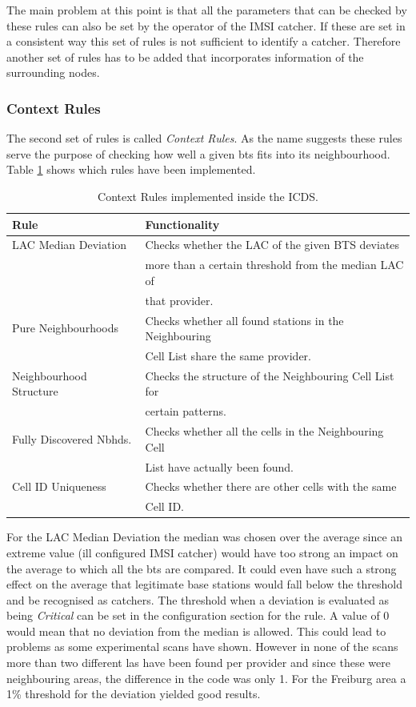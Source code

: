The main problem at this point is that all the parameters that can be checked by these rules can also be set by the operator of the IMSI catcher.
If these are set in a consistent way this set of rules is not sufficient to identify a catcher.
Therefore another set of rules has to be added that incorporates information of the surrounding nodes.

\subsubsection{Context Rules}
The second set of rules is called \emph{Context Rules}.
As the name suggests these rules serve the purpose of checking how well a given \gls{bts} fits into its neighbourhood.
Table \ref{tab:context_rules} shows which rules have been implemented.
\begin{table}
\centering
\begin{tabular}{ll}
\toprule
Rule					&Functionality\\
\midrule
LAC Median Deviation	&Checks whether the LAC of the given BTS deviates\\
						&more than a certain threshold from the median LAC of\\
						&that provider.\\
Pure Neighbourhoods		&Checks whether all found stations in the Neighbouring\\
						&Cell List share the same provider.\\
Neighbourhood Structure	&Checks the structure of the Neighbouring Cell List for\\
						&certain patterns.\\
Fully Discovered Nbhds. &Checks whether all the cells in the Neighbouring Cell\\
						&List have actually been found.\\
Cell ID Uniqueness 		&Checks whether there are other cells with the same\\
						&Cell ID.\\
\bottomrule
\end{tabular}
\caption{Context Rules implemented inside the ICDS.}
\label{tab:context_rules}
\end{table}

For the LAC Median Deviation the median was chosen over the average since an extreme value (ill configured IMSI catcher) would have too strong an impact on the average to which all the \gls{bts} are compared.
It could even have such a strong effect on the average that legitimate base stations would fall below the threshold and be recognised as catchers.
The threshold when a deviation is evaluated as being \emph{Critical} can be set in the configuration section for the rule.
A value of 0 would mean that no deviation from the median is allowed.
This could lead to problems as some experimental scans have shown.
However in none of the scans more than two different \glspl{la} have been found per provider and since these were neighbouring areas, the difference in the code was only 1.
For the Freiburg area a 1\% threshold for the deviation yielded good results.

